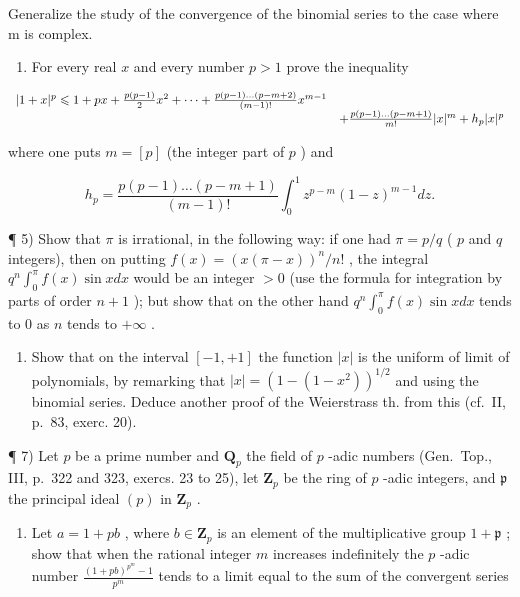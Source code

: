 Generalize the study of the convergence of the binomial series to the case where m is complex.

\begin{enumerate}
\def\labelenumi{\arabic{enumi})}
\setcounter{enumi}{3}
\tightlist
\item
  For every real \(x\) and every number \(p > 1\) prove the inequality
\end{enumerate}

\[
\begin{array}{r l} | 1 + x | ^ {p} \leqslant 1 + p x + \frac {p (p - 1)}{2} x ^ {2} + \dots + \frac {p (p - 1) \dots (p - m + 2)}{(m - 1) !} x ^ {m - 1} \\ & + \frac {p (p - 1) \dots (p - m + 1)}{m !} | x | ^ {m} + h _ {p} | x | ^ {p} \end{array}
\]

where one puts \(m = [p]\) (the integer part of \(p\) ) and

\[
h _ {p} = \frac {p (p - 1) \dots (p - m + 1)}{(m - 1) !} \int_ {0} ^ {1} z ^ {p - m} (1 - z) ^ {m - 1} d z.
\]

¶ 5) Show that \(\pi\) is irrational, in the following way: if one had \(\pi = p/q\) ( \(p\) and \(q\) integers), then on putting \(f(x) = (x(\pi - x))^n / n!\) , the integral \(q^n \int_0^\pi f(x) \sin x dx\) would be an integer \(>0\) (use the formula for integration by parts of order \(n + 1\) ); but show that on the other hand \(q^n \int_0^\pi f(x) \sin x dx\) tends to 0 as \(n\) tends to \(+\infty\) .

\begin{enumerate}
\def\labelenumi{\arabic{enumi})}
\setcounter{enumi}{5}
\tightlist
\item
  Show that on the interval \([-1,+1]\) the function \(|x|\) is the uniform of limit of polynomials, by remarking that \(|x|=(1-(1-x^{2}))^{1/2}\) and using the binomial series. Deduce another proof of the Weierstrass th. from this (cf.~II, p.~83, exerc. 20).
\end{enumerate}

¶ 7) Let \(p\) be a prime number and \(\mathbf{Q}_p\) the field of \(p\) -adic numbers (Gen.~Top., III, p.~322 and 323, exercs. 23 to 25), let \(\mathbf{Z}_p\) be the ring of \(p\) -adic integers, and \(\mathfrak{p}\) the principal ideal \((p)\) in \(\mathbf{Z}_p\) .

\begin{enumerate}
\def\labelenumi{\alph{enumi})}
\tightlist
\item
  Let \(a = 1 + pb\) , where \(b \in \mathbf{Z}_p\) is an element of the multiplicative group \(1 + \mathfrak{p}\) ; show that when the rational integer \(m\) increases indefinitely the \(p\) -adic number \(\frac{(1 + pb)^{p^m} - 1}{p^m}\) tends to a limit equal to the sum of the convergent series
\end{enumerate}

